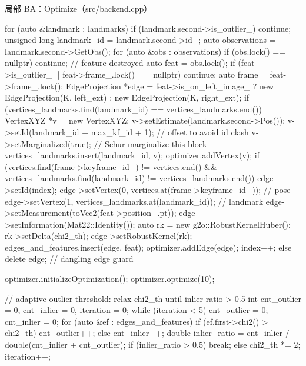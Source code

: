 \begin{codebox}[C++]{局部 BA：Optimize（src/backend.cpp）}
{    for (auto &landmark : landmarks) {
        if (landmark.second->is_outlier_) continue;
        unsigned long landmark_id = landmark.second->id_;
        auto observations = landmark.second->GetObs();
        for (auto &obs : observations) {
            if (obs.lock() == nullptr) continue;            // feature destroyed
            auto feat = obs.lock();
            if (feat->is_outlier_ || feat->frame_.lock() == nullptr) continue;
            auto frame = feat->frame_.lock();
            EdgeProjection *edge = feat->is_on_left_image_
                ? new EdgeProjection(K, left_ext)
                : new EdgeProjection(K, right_ext);
            if (vertices_landmarks.find(landmark_id) == vertices_landmarks.end()) {
                VertexXYZ *v = new VertexXYZ;
                v->setEstimate(landmark.second->Pos());
                v->setId(landmark_id + max_kf_id + 1);      // offset to avoid id clash
                v->setMarginalized(true);                   // Schur-marginalize this block
                vertices_landmarks.insert({landmark_id, v});
                optimizer.addVertex(v);
            }
            if (vertices.find(frame->keyframe_id_) != vertices.end() &&
                vertices_landmarks.find(landmark_id) != vertices_landmarks.end()) {
                edge->setId(index);
                edge->setVertex(0, vertices.at(frame->keyframe_id_));      // pose
                edge->setVertex(1, vertices_landmarks.at(landmark_id));    // landmark
                edge->setMeasurement(toVec2(feat->position_.pt));
                edge->setInformation(Mat22::Identity());
                auto rk = new g2o::RobustKernelHuber();
                rk->setDelta(chi2_th);
                edge->setRobustKernel(rk);
                edges_and_features.insert({edge, feat});
                optimizer.addEdge(edge);
                index++;
            } else {
                delete edge;                                // dangling edge guard
            }
        }
    }

    optimizer.initializeOptimization();
    optimizer.optimize(10);

    // adaptive outlier threshold: relax chi2_th until inlier ratio > 0.5
    int cnt_outlier = 0, cnt_inlier = 0, iteration = 0;
    while (iteration < 5) {
        cnt_outlier = 0; cnt_inlier = 0;
        for (auto &ef : edges_and_features) {
            if (ef.first->chi2() > chi2_th) cnt_outlier++; else cnt_inlier++;
        }
        double inlier_ratio = cnt_inlier / double(cnt_inlier + cnt_outlier);
        if (inlier_ratio > 0.5) break;
        else { chi2_th *= 2; iteration++; }
    }

}
\end{codebox}
